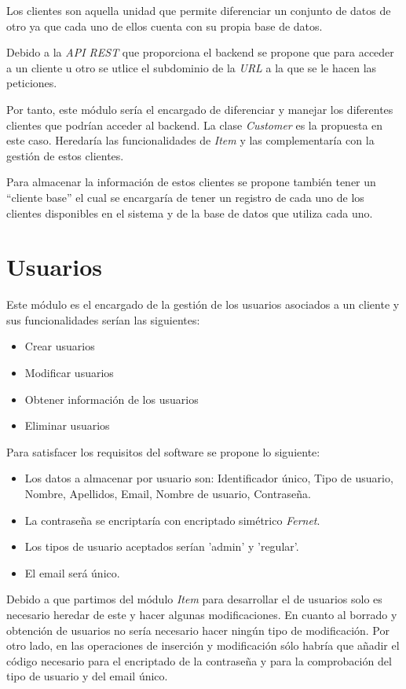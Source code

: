 Los clientes son aquella unidad que permite diferenciar un conjunto de datos de otro ya que cada uno de ellos cuenta con su propia base de datos. 

Debido a la \textit{API REST} que proporciona el backend se propone que para acceder a un cliente u otro se utlice el subdominio de la \textit{URL} a la que se le hacen las peticiones.

Por tanto, este módulo sería el encargado de diferenciar y manejar los diferentes clientes que podrían acceder al backend. La clase \textit{Customer} es la propuesta en este caso. Heredaría las funcionalidades de \textit{Item} y las complementaría con la gestión de estos clientes.

Para almacenar la información de estos clientes se propone también tener un ``cliente base'' el cual se encargaría de tener un registro de cada uno de los clientes disponibles en el sistema y de la base de datos que utiliza cada uno.



\section{Usuarios}
\label{sec:usercap6}

Este módulo es el encargado de la gestión de los usuarios asociados a un cliente y sus funcionalidades serían las siguientes:
\begin{itemize}
	\item Crear usuarios
	\item Modificar usuarios
	\item Obtener información de los usuarios
	\item Eliminar usuarios
\end{itemize}


\bigskip
Para satisfacer los requisitos del software se propone lo siguiente:
\begin{itemize}
	\item Los datos a almacenar por usuario son: Identificador único, Tipo de usuario, Nombre, Apellidos, Email, Nombre de usuario, Contraseña.
	\item La contraseña se encriptaría con encriptado simétrico \textit{Fernet}.
	\item Los tipos de usuario aceptados serían 'admin' y 'regular'.
	\item El email será único.
\end{itemize}



\bigskip
Debido a que partimos del módulo \textit{Item} para desarrollar el de usuarios solo es necesario heredar de este y hacer algunas modificaciones. En cuanto al borrado y obtención de usuarios no sería necesario hacer ningún tipo de modificación. Por otro lado, en las operaciones de inserción y modificación sólo habría que añadir el código necesario para el encriptado de la contraseña y para la comprobación del tipo de usuario y del email único.

